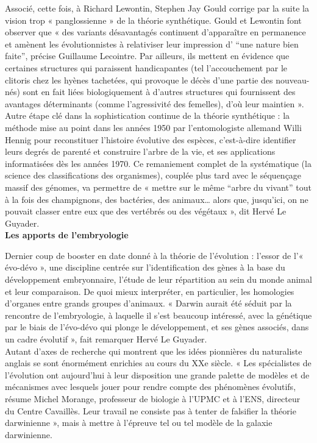 \documentclass[8pt]{article}
\begin{document}
Associé, cette fois, à Richard Lewontin, Stephen Jay Gould corrige par la suite la vision trop « panglossienne » de la théorie synthétique. Gould et Lewontin font observer que « des variants désavantagés continuent d’apparaître en permanence et amènent les évolutionnistes à relativiser leur impression d’ “une nature bien faite”, précise Guillaume Lecointre. Par ailleurs, ils mettent en évidence que certaines structures qui paraissent handicapantes (tel l’accouchement par le clitoris chez les hyènes tachetées, qui provoque le décès d’une partie des nouveau-nés) sont en fait liées biologiquement à d’autres structures qui fournissent des avantages déterminants (comme l’agressivité des femelles), d’où leur maintien ».\\

Autre étape clé dans la sophistication continue de la théorie synthétique : la méthode mise au point dans les années 1950 par l’entomologiste allemand Willi Hennig pour reconstituer l’histoire évolutive des espèces, c’est-à-dire identifier leurs degrés de parenté et construire l’arbre de la vie, et ses applications informatisées dès les années 1970. Ce remaniement complet de la systématique (la science des classifications des organismes), couplée plus tard avec le séquençage massif des génomes, va permettre de « mettre sur le même “arbre du vivant” tout à la fois des champignons, des bactéries, des animaux… alors que, jusqu’ici, on ne pouvait classer entre eux que des vertébrés ou des végétaux », dit Hervé Le Guyader.\\

\textbf{Les apports de l’embryologie}

Dernier coup de booster en date donné à la théorie de l’évolution : l’essor de l’« évo-dévo », une discipline centrée sur l’identification des gènes à la base du développement embryonnaire, l’étude de leur répartition au sein du monde animal et leur comparaison. De quoi mieux interpréter, en particulier, les homologies d’organes entre grands groupes d’animaux. « Darwin aurait été séduit par la rencontre de l’embryologie, à laquelle il s’est beaucoup intéressé, avec la génétique par le biais de l’évo-dévo qui plonge le développement, et ses gènes associés, dans un cadre évolutif », fait remarquer Hervé Le Guyader.\\

Autant d’axes de recherche qui montrent que les idées pionnières du naturaliste anglais se sont énormément enrichies au cours du XXe siècle. « Les spécialistes de l’évolution ont aujourd’hui à leur disposition une grande palette de modèles et de mécanismes avec lesquels jouer pour rendre compte des phénomènes évolutifs, résume Michel Morange, professeur de biologie à l’UPMC et à l’ENS, directeur du Centre Cavaillès. Leur travail ne consiste pas à tenter de falsifier la théorie darwinienne », mais à mettre à l’épreuve tel ou tel modèle de la galaxie darwinienne.\\
\end{document}
